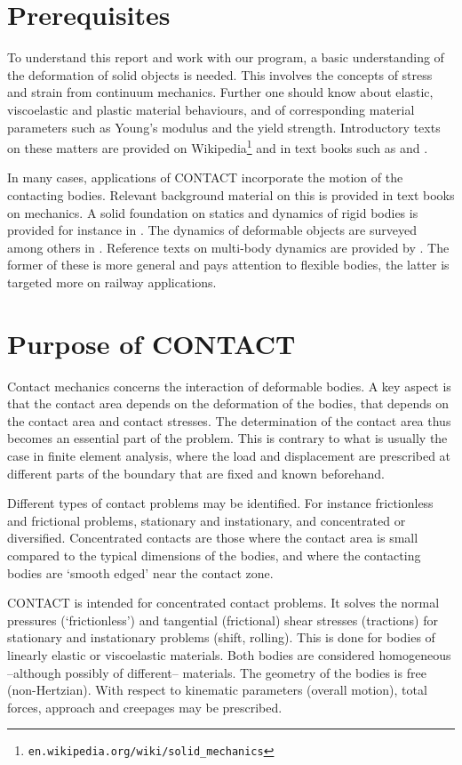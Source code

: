 \documentclass[12pt]{report}
\begin{document}
\section{Prerequisites}

To understand this report and work with our program, a basic understanding
of the deformation of solid objects is needed. This involves the concepts
of stress and strain from continuum mechanics. Further one should know
about elastic, viscoelastic and plastic material behaviours, and of
corresponding material parameters such as Young's modulus and the yield
strength. Introductory texts on these matters are provided on
Wikipedia\footnote{{\tt en.wikipedia.org/wiki/solid\_mechanics}} and in
text books such as \cite{Bower2008} and \cite{Naghdi2001}.

In many cases, applications of CONTACT incorporate the motion of the contacting
bodies. Relevant background material on this is provided in text books on
mechanics. A solid foundation on statics and dynamics of rigid bodies is
provided for instance in \cite{Hibbeler2012}. The dynamics of deformable
objects are surveyed among others in \cite{Craig2006}. Reference texts on
multi-body dynamics are provided by \cite{Shabana2013,Shabana2008}. The
former of these is more general and pays attention to flexible bodies, the
latter is targeted more on railway applications.

\section{Purpose of CONTACT}

Contact mechanics concerns the interaction of deformable bodies. A key
aspect is that the contact area depends on the deformation of the bodies,
that depends on the contact area and contact stresses. The determination of
the contact area thus becomes an essential part of the problem.
This is contrary to what is usually the case in finite element analysis,
where the load and displacement are prescribed at different parts of the
boundary that are fixed and known beforehand.

Different types of contact problems may be identified. For instance
frictionless and frictional problems, stationary and instationary, and
concentrated or diversified. Concentrated contacts are those where the
contact area is small compared to the typical dimensions of the bodies,
and where the contacting bodies are `smooth edged' near the contact zone.

CONTACT is intended for concentrated contact problems. It solves the normal
pressures (`frictionless') and tangential (frictional) shear stresses
(tractions) for stationary and instationary problems (shift, rolling). This
is done for bodies of linearly elastic or viscoelastic materials. Both
bodies are considered homogeneous --although possibly of different--
materials.  The geometry of the bodies is free (non-Hertzian).  With
respect to kinematic parameters (overall motion), total forces, approach
and creepages may be prescribed.
\end{document}
